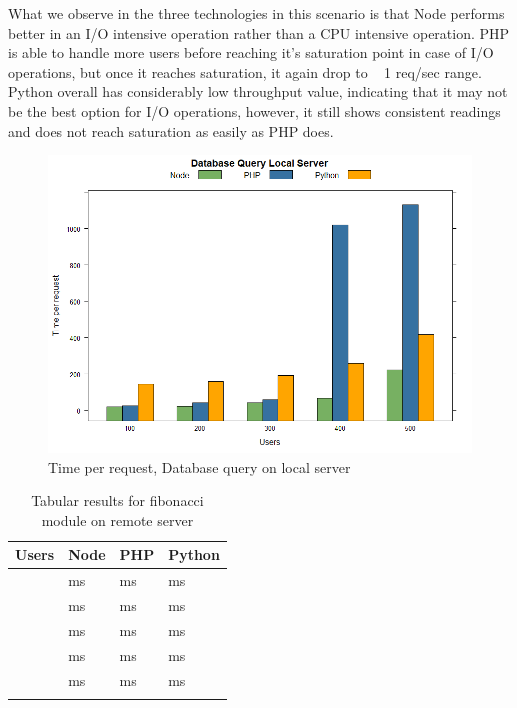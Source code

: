 \documentclass[../thesis.tex]{subfiles}
\begin{document}
What we observe in the three technologies in this scenario is that Node performs better in an I/O intensive operation rather than a CPU intensive operation. PHP is able to handle more users before reaching it's saturation point in case of I/O operations, but once it reaches saturation, it again drop to ~ 1 req/sec range. Python overall has considerably low throughput value, indicating that it may not be the best option for I/O operations, however, it still shows consistent readings and does not reach saturation as easily as PHP does.
\newpage
\begin{figure}[H]
	\centering
	\includegraphics[width=1\textwidth]{../images/dbLocaltpr.png}
	\caption{Time per request, Database query on local server}
	\label{rys1}
\end{figure}
\begin{table}[H]
	\caption{Tabular results for fibonacci module on remote server}
	\centering
	\footnotesize
	\label{tab1}
	\bigskip
	\begin{tabular}{!{\color{sapphire}\vrule width 1pt}m{0.22\textwidth}!{\color{black}\vrule width 1pt}m{0.22\textwidth}!{\color{black}\vrule width 1pt}m{0.22\textwidth}!{\color{black}\vrule width 1pt}m{0.22\textwidth}!{\color{sapphire}\vrule width 1pt}}
		\hline
		\Centering \textbf{Users} &
		\Centering \textbf{Node} &
		\Centering \textbf{PHP} &
		\Centering \textbf{Python} \\
		\hline
		 &
		 ms &
		 ms&
		 ms\\
		\hline
		 &
		 ms&
		 ms&
		 ms\\
		\hline
		 &
		 ms&
		 ms&
		 ms\\
		\hline
		 &
		 ms&
		 ms&
		 ms\\
		\hline
		 &
		 ms&
		 ms&
		 ms\\
		\hline
		\hline
	\end{tabular}
\end{table}
\end{document}
